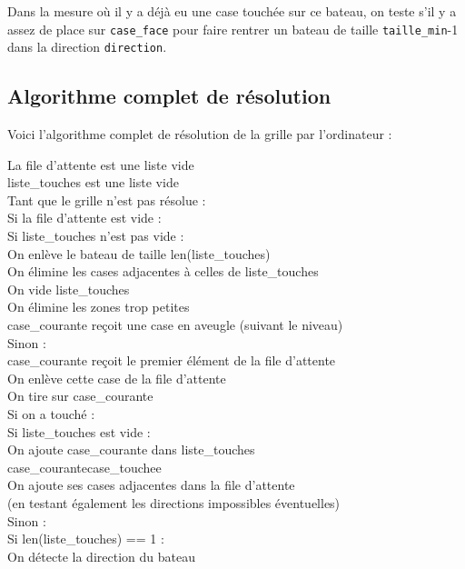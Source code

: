 \medskip

Dans la mesure où il y a déjà eu une case touchée sur ce bateau, on teste s'il y a assez de place sur \texttt{case\_face} pour faire rentrer un bateau de taille \texttt{taille\_min}-1 dans la direction \texttt{direction}.

\newpage
\subsection{Algorithme complet de résolution}\label{algo_resolution}
Voici l'algorithme complet de résolution de la grille par l'ordinateur :

\begin{algo1}
La file d'attente est une liste vide\\
liste\_touches est une liste vide\\
Tant que le grille n'est pas résolue :\\
Si la file d'attente est vide :\\
Si liste\_touches n'est pas vide :\\
On enlève le bateau de taille len(liste\_touches)\\
On élimine les cases adjacentes à celles de liste\_touches\\
On vide liste\_touches\\
On élimine les zones trop petites\\
case\_courante reçoit une case en aveugle (suivant le niveau)\\
Sinon :\\
case\_courante reçoit le premier élément de la file d'attente\\
On enlève cette case de la file d'attente\\
On tire sur case\_courante\\
Si on a touché :\\
Si liste\_touches est vide :\\
On ajoute case\_courante dans liste\_touches\\
case\_courante\sto case\_touchee\\
On ajoute ses cases adjacentes dans la file d'attente\\
(en testant également les directions impossibles éventuelles)\\
Sinon :\\
Si len(liste\_touches) == 1 :\\
On détecte la direction du bateau\\

\end{algo1}
